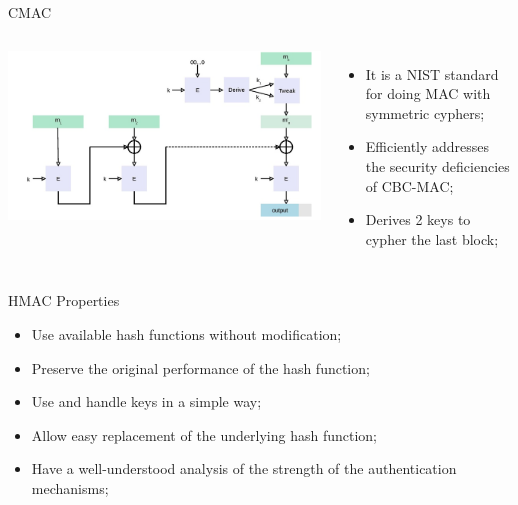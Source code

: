 \documentclass[12pt,table,xcolor={dvipsnames}]{beamer}
\begin{document}
\begin{frame}{CMAC}
\begin{columns}
\begin{center}
\includegraphics[scale=.22]{OMAC.png}
\end{center}
\begin{itemize}
\item It is a NIST standard for doing MAC with symmetric cyphers;\pause
\item Efficiently addresses the security deficiencies of CBC-MAC;\pause
\item Derives 2 keys to cypher the last block;
\end{itemize}
\end{columns}
\end{frame}

\begin{frame}{HMAC Properties}
\begin{itemize}
\item Use available hash functions without modification;\pause
\item Preserve the original performance of the hash function;\pause
\item Use and handle keys in a simple way;\pause
\item Allow easy replacement of the underlying hash function;\pause
\item Have a well-understood analysis of the strength of the authentication mechanisms;
\end{itemize}
\end{frame}
\end{document}
